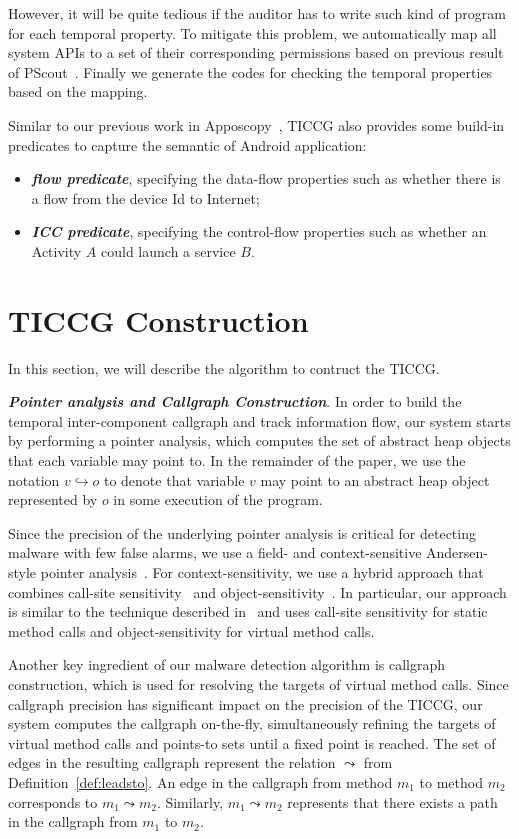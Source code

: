 \documentclass{article}
\begin{document}
However, it will be quite tedious if the auditor has to write such kind of 
program for each temporal property. To mitigate this problem, we automatically map
all system APIs to a set of their corresponding permissions based on previous result of
PScout~\cite{pscout}. Finally we generate the codes for checking the temporal properties 
based on the mapping.  

Similar to our previous work in Apposcopy~\cite{apposcopy}, TICCG also provides some 
build-in predicates to capture the semantic of Android application:
\begin{itemize}
\item {\bf \emph{flow predicate}}, specifying the data-flow properties such as whether 
there is a flow from the device Id to Internet;
\item {\bf \emph{ICC predicate}}, specifying the control-flow properties such as
whether an Activity $A$ could launch a service $B$.
\end{itemize}



\section{TICCG Construction}
\label{sec:construct}
In this section, we will describe the algorithm to contruct the TICCG. 

{\bf \emph{Pointer analysis and Callgraph Construction}}. In order to build the temporal inter-component callgraph and track information flow, our system starts by performing a pointer analysis, 
which computes the set of abstract heap objects that each variable may point to. In the remainder of the paper, we use the notation 
 $v \hookrightarrow o$ to denote  that 
variable $v$ may point to an abstract heap object  represented by  $o$ in some execution of the program. 



Since the precision of the underlying pointer analysis  is critical for detecting malware with few false alarms, 
we use a field- and context-sensitive Andersen-style pointer analysis~\cite{andersen}. For context-sensitivity, we use a hybrid approach
that combines call-site sensitivity~\cite{kcfa} and object-sensitivity~\cite{MilanovaRR05}. 
In particular, our approach is  similar to the technique described in~\cite{hybrid-context} and uses
call-site sensitivity for static method calls and object-sensitivity for virtual method calls. 

Another key ingredient of our  malware detection algorithm is callgraph construction, which is used for resolving the 
targets of virtual method calls. Since callgraph precision  has significant impact on the precision of the TICCG, 
our system computes the callgraph on-the-fly, simultaneously refining the targets of virtual method calls and points-to sets  until a fixed point is reached. The set of edges in the resulting callgraph represent the relation $\leadsto$ from
Definition~\ref{def:leadsto}. An edge in the callgraph from method $m_1$
to  method $m_2$ corresponds to $m_1 \leadsto m_2$.
Similarly, $m_1 \leadsto m_2$
represents that there exists a path in the callgraph from 
$m_1$ to  $m_2$.
\end{document}
